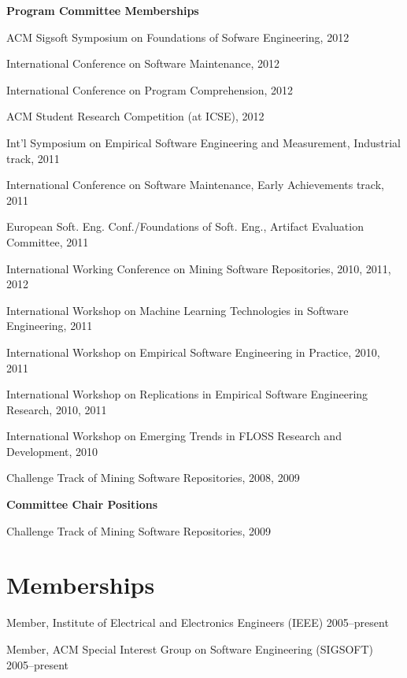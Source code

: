 \documentclass[margin,line,article,letterpaper]{res}
\newenvironment{noindentlist}{
  \begin{list}{}{%
      \setlength{\itemsep}{0in}
      \setlength{\parsep}{0in} \setlength{\parskip}{0in}
      \setlength{\topsep}{0in} \setlength{\partopsep}{0in} 
      \setlength{\leftmargin}{0in}}}{\end{list}}
\newenvironment{list1}{
  \begin{list}{}{%
      \setlength{\itemsep}{0in}
      \setlength{\parsep}{0in} \setlength{\parskip}{0in}
      \setlength{\topsep}{0in} \setlength{\partopsep}{0in} 
      \setlength{\leftmargin}{0.17in}}}{\end{list}}
\begin{document}
\begin{resume}
\textbf{Program Committee Memberships}
\begin{list1}
\item ACM Sigsoft Symposium on Foundations of Sofware Engineering, 2012
\item International Conference on Software Maintenance, 2012
\item International Conference on Program Comprehension, 2012
\item ACM Student Research Competition (at ICSE), 2012
\item Int'l Symposium on Empirical Software Engineering and Measurement, Industrial track, 2011
\item International Conference on Software Maintenance, Early Achievements track, 2011
\item European Soft. Eng. Conf./Foundations of Soft. Eng., Artifact Evaluation Committee, 2011
\item International Working Conference on Mining Software Repositories, 2010, 2011, 2012
\item International Workshop on Machine Learning Technologies in Software Engineering, 2011
\item International Workshop on Empirical Software Engineering in Practice, 2010, 2011
\item International Workshop on Replications in Empirical Software Engineering Research, 2010, 2011
\item International Workshop on Emerging Trends in FLOSS Research and Development, 2010
\item Challenge Track of Mining Software Repositories, 2008, 2009
\end{list1}

\textbf{Committee Chair Positions}
\begin{list1}
\item Challenge Track of Mining Software Repositories, 2009
\end{list1}

\section{Memberships}
\begin{noindentlist}
\item Member, Institute of Electrical and Electronics Engineers (IEEE) \hfill 2005--present
\item Member, ACM Special Interest Group on Software Engineering (SIGSOFT) \hfill 2005--present
\end{noindentlist}




\end{resume}
\end{document}
